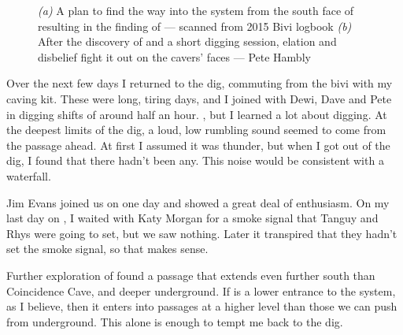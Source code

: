 \begin{figure}[t!]
        \caption{
            \textsl{(a)} A plan to find the way into the system from the south face of  resulting in the finding of  --- scanned from 2015 Bivi logbook
            \textsl{(b)} After the discovery of  and a short digging session, elation and disbelief fight it out on the cavers' faces --- Pete Hambly}
        \label{}

    \end{figure}

    Over the next few days I returned to the dig, commuting from the bivi with my caving kit. These were long, tiring days, and I joined with Dewi, Dave and Pete in digging shifts of around half an hour. , but I learned a lot about digging. At the deepest limits of the dig, a loud, low rumbling sound seemed to come from the passage ahead. At first I assumed it was thunder, but when I got out of the dig, I found that there hadn't been any. This noise would be consistent with a waterfall.

    Jim Evans joined us on one day and showed a great deal of enthusiasm. On my last day on , I waited with Katy Morgan for a smoke signal that Tanguy and Rhys were going to set, but we saw nothing. Later it transpired that they hadn't set the smoke signal, so that makes sense.

    Further exploration of  found a passage that extends even further south than Coincidence Cave, and deeper underground. If  is a lower entrance to the system, as I believe, then it enters into passages at a higher level than those we can push from underground. This alone is enough to tempt me back to the dig.

